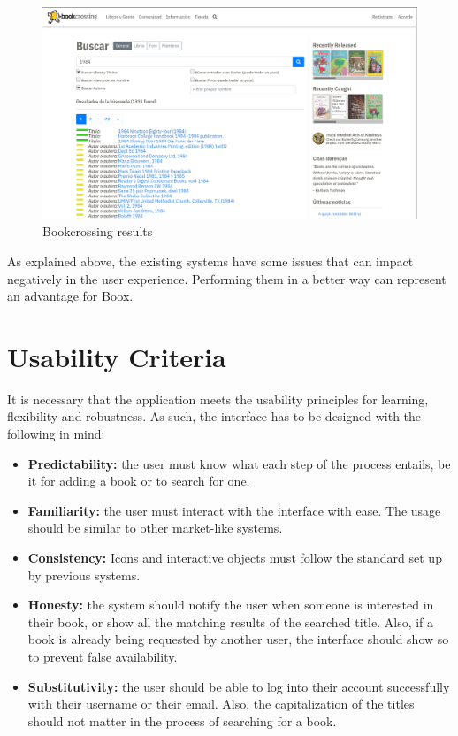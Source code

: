 \documentclass{article}
\begin{document}
\begin{figure}[h]
    \centering
    \includegraphics[scale=0.2]{img/bookcrosing_search.png}
    \caption{Bookcrossing results}
    \label{fig:bookcrossing2}
\end{figure}

As explained above, the existing systems have some issues that can impact negatively in the user experience. Performing them in a better way can represent an advantage for Boox.

\section{Usability Criteria}
It is necessary that the application meets the usability principles for learning, flexibility and robustness. As such, the interface has to be designed with the following in mind:
\begin{itemize}
    \item \textbf{Predictability:} the user must know what each step of the process entails, be it for adding a book or to search for one. 
    \item \textbf{Familiarity:} the user must interact with the interface with ease. The usage should be similar to other market-like systems.
    \item \textbf{Consistency:} Icons and interactive objects must follow the standard set up by previous systems. 
    \item \textbf{Honesty:} the system should notify the user when someone is interested in their book, or show all the matching results of the searched title. Also, if a book is already being requested by another user, the interface should show so to prevent false availability.
    \item \textbf{Substitutivity:} the user should be able to log into their account successfully with their username or their email. Also, the capitalization of the titles should not matter in the process of searching for a book.
\end{itemize}
\end{document}
